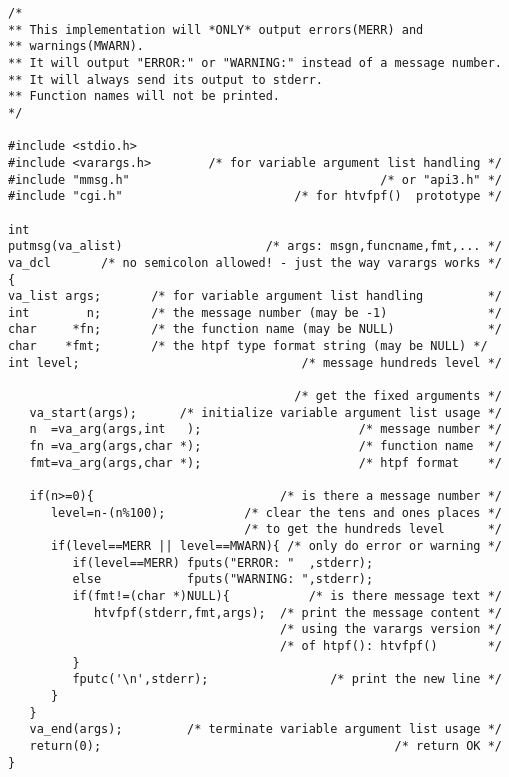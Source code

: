\EXAMPLE
\begin{verbatim}
/*
** This implementation will *ONLY* output errors(MERR) and
** warnings(MWARN).
** It will output "ERROR:" or "WARNING:" instead of a message number.
** It will always send its output to stderr.
** Function names will not be printed.
*/

#include <stdio.h>
#include <varargs.h>        /* for variable argument list handling */
#include "mmsg.h"                                   /* or "api3.h" */
#include "cgi.h"                        /* for htvfpf()  prototype */

int
putmsg(va_alist)                    /* args: msgn,funcname,fmt,... */
va_dcl       /* no semicolon allowed! - just the way varargs works */
{
va_list args;       /* for variable argument list handling         */
int        n;       /* the message number (may be -1)              */
char     *fn;       /* the function name (may be NULL)             */
char    *fmt;       /* the htpf type format string (may be NULL) */
int level;                               /* message hundreds level */

                                        /* get the fixed arguments */
   va_start(args);      /* initialize variable argument list usage */
   n  =va_arg(args,int   );                      /* message number */
   fn =va_arg(args,char *);                      /* function name  */
   fmt=va_arg(args,char *);                      /* htpf format    */

   if(n>=0){                          /* is there a message number */
      level=n-(n%100);           /* clear the tens and ones places */
                                 /* to get the hundreds level      */
      if(level==MERR || level==MWARN){ /* only do error or warning */
         if(level==MERR) fputs("ERROR: "  ,stderr);
         else            fputs("WARNING: ",stderr);
         if(fmt!=(char *)NULL){           /* is there message text */
            htvfpf(stderr,fmt,args);  /* print the message content */
                                      /* using the varargs version */
                                      /* of htpf(): htvfpf()       */
         }
         fputc('\n',stderr);                 /* print the new line */
      }
   }
   va_end(args);         /* terminate variable argument list usage */
   return(0);                                         /* return OK */
}

\end{verbatim}

\NOTES

